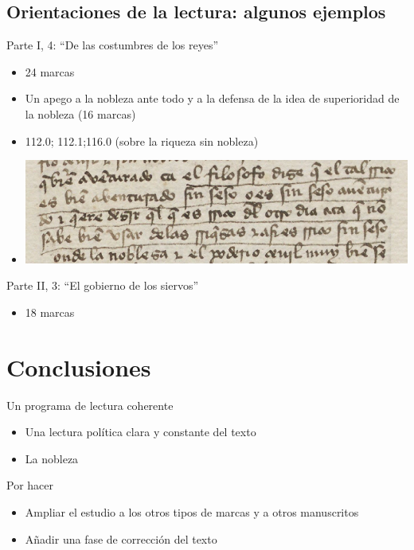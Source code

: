 \documentclass[11pt,aspectratio=169]{beamer}
\begin{document}
\subsection{Orientaciones de la lectura: algunos ejemplos}
\begin{frame}{Parte I, 4: \enquote{De las costumbres de los reyes}}
\begin{itemize}
\item 24 marcas
\item Un apego a la nobleza ante todo y a la defensa de la idea de superioridad de la nobleza (16 marcas)
\item 112.0; 112.1;116.0 (sobre la riqueza sin nobleza)
\item \begin{center}\includegraphics[width=.6\textwidth]{../results/kraken_transcription_results/pg_0116_0.png}\end{center}
\end{itemize}
\end{frame}

\begin{frame}{Parte II, 3: \enquote{El gobierno de los siervos}}
\begin{itemize}
\item 18 marcas
\end{itemize}
\end{frame}



\section*{Conclusiones}

\begin{frame}{Un programa de lectura coherente}
\begin{center}
\begin{itemize}
\item Una lectura política clara y constante del texto
\item La nobleza 
\end{itemize}
\end{center}
\end{frame}


\begin{frame}{Por hacer}
\begin{center}
\begin{itemize}
\item Ampliar el estudio a los otros tipos de marcas y a otros manuscritos
\item Añadir una fase de corrección del texto
\end{itemize}
\end{center}
\end{frame}
\end{document}
